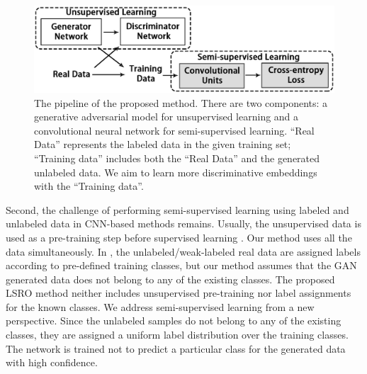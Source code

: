\documentclass[10pt,twocolumn,letterpaper]{article}
\begin{document}
\begin{figure}[t]
\begin{center}
   \includegraphics[width=1\linewidth]{fig0.eps}
\end{center}
   \caption{The pipeline of the proposed method. There are two components: a generative adversarial model \cite{radford2015unsupervised} for unsupervised learning and a convolutional neural network for semi-supervised learning. ``Real Data'' represents the labeled data in the given training set; ``Training data'' includes both the ``Real Data'' and the generated unlabeled data. We aim to learn more discriminative embeddings with the ``Training data''. }
\label{fig:pipeline}
\end{figure}

Second, the challenge of performing semi-supervised learning using labeled and unlabeled data in CNN-based methods remains. Usually, the unsupervised data is used as a pre-training step before supervised learning \cite{ranzato2008semi,goodfellow2013multi,hinton2006reducing}. Our method uses all the data simultaneously. In \cite{papandreou2015weakly,lee2013pseudo,odena2016semi,salimans2016improved}, the unlabeled/weak-labeled real data are assigned labels according to pre-defined training classes, but our method assumes that the GAN generated data does not belong to any of the existing classes. The proposed LSRO method neither includes unsupervised pre-training nor label assignments for the known classes. We address semi-supervised learning from a new perspective. Since the unlabeled samples do not belong to any of the existing classes, they are assigned a uniform label distribution over the training classes. The network is trained not to predict a particular class for the generated data with high confidence.
\end{document}
